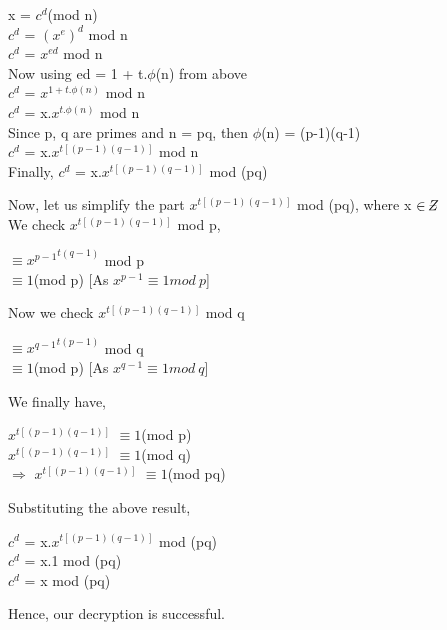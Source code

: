 \documentclass[11pt]{article}
\newcommand{\zbar}{\raisebox{0.2ex}{--}\kern-0.6em Z}
\begin{document}
\begin{center}
    x = $c^d$(mod n)\\
    \vspace{1mm}
    $c^d$ = ${(x^e)}^d$ mod n\\
    \vspace{1mm}
    $c^d$ = $x^{ed}$ mod n\\
    \vspace{1mm}
    Now using ed = 1 + t.$\phi$(n) from above\\
    \vspace{1mm}
    $c^d$ = $x^{1+t.\phi(n)}$ mod n\\
    \vspace{1mm}
    $c^d$ = x.$x^{t.\phi(n)}$ mod n\\
    \vspace{1mm}
    Since p, q are primes and n = pq, then $\phi$(n) = (p-1)(q-1)\\
    \vspace{1mm}
    $c^d$ = x.$x^{t[(p-1)(q-1)]}$ mod n\\
    \vspace{1mm}
    Finally,
    $c^d$ = x.$x^{t[(p-1)(q-1)]}$ mod (pq)\\
\end{center}
Now, let us simplify the part $x^{t[(p-1)(q-1)]}$ mod (pq), where x $\in \zbar$ \\
We check $x^{t[(p-1)(q-1)]}$ mod p,
\begin{center}
    $\equiv {x^{p-1}}^{t(q-1)}$ mod p\\
    $\equiv 1 $(mod p) [As $x^{p-1} \equiv 1 mod\ p$]\\
\end{center}
Now we check $x^{t[(p-1)(q-1)]}$ mod q
\begin{center}
    $\equiv {x^{q-1}}^{t(p-1)}$ mod q\\
    $\equiv 1 $(mod p) [As $x^{q-1} \equiv 1 mod\ q$]\\
\end{center}
    
We finally have,
\begin{center}
    $x^{t[(p-1)(q-1)]}$ $\equiv 1 $(mod p)\\
    \vspace{1mm}
    $x^{t[(p-1)(q-1)]}$ $\equiv 1 $(mod q)\\
    \vspace{1mm}
    $\Rightarrow$ $x^{t[(p-1)(q-1)]}$ $\equiv 1 $(mod pq)\\
\end{center}
Substituting the above result, 
\begin{center}
     $c^d$ = x.$x^{t[(p-1)(q-1)]}$ mod (pq)\\
      $c^d$ = x.1 mod (pq)\\
      $c^d$ = x mod (pq)\\
\end{center}
Hence, our decryption is successful.\\
\end{document}
